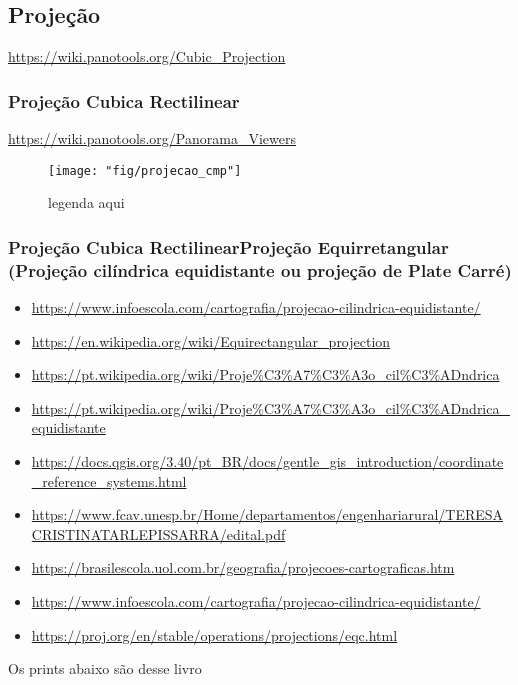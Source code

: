 \subsection{Projeção}
\href{https://wiki.panotools.org/Cubic_Projection}{https://wiki.panotools.org/Cubic\_Projection}

\subsubsection{Projeção Cubica Rectilinear}
\href{https://wiki.panotools.org/Panorama_Viewers}{https://wiki.panotools.org/Panorama\_Viewers}

\begin{figure}[tbh]
	\centering
	\texttt{[image: "fig/projecao\_cmp"]}
	\caption{legenda aqui}
	\label{fig:projecao_cmp}
\end{figure}

\subsubsection{Projeção Cubica RectilinearProjeção Equirretangular (Projeção cilíndrica equidistante ou projeção de Plate Carré)}

\begin{itemize}
	\item \url{https://www.infoescola.com/cartografia/projecao-cilindrica-equidistante/}
	\item \url{https://en.wikipedia.org/wiki/Equirectangular_projection}
	\item \url{https://pt.wikipedia.org/wiki/Proje%C3%A7%C3%A3o_cil%C3%ADndrica}
	\item \url{https://pt.wikipedia.org/wiki/Proje%C3%A7%C3%A3o_cil%C3%ADndrica_equidistante}
	\item \url{https://docs.qgis.org/3.40/pt_BR/docs/gentle_gis_introduction/coordinate_reference_systems.html}
	\item \url{https://www.fcav.unesp.br/Home/departamentos/engenhariarural/TERESACRISTINATARLEPISSARRA/edital.pdf}
	\item \url{https://brasilescola.uol.com.br/geografia/projecoes-cartograficas.htm}
	\item \url{https://www.infoescola.com/cartografia/projecao-cilindrica-equidistante/}
	\item \url{https://proj.org/en/stable/operations/projections/eqc.html}
\end{itemize}

Os prints abaixo são desse livro

